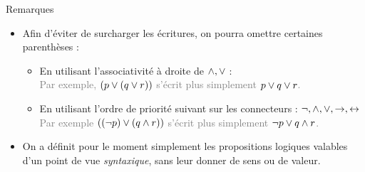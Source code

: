 \documentclass[10pt]{beamer}
\begin{document}
\begin{frame}{\Ctitle}{\stitle}
	\begin{block}{Remarques}
		\begin{itemize}
			\item Afin d'éviter de surcharger les écritures, on pourra omettre certaines parenthèses :
			      \begin{itemize}
				      \item<2-> En utilisant l'associativité à droite de $\wedge, \vee$ : \\
					      \onslide<3-> \textcolor{gray}{Par exemple, $(p \vee (q \vee r))$ s'écrit plus simplement $p \vee q \vee r$.}
				      \item<4-> En utilisant l'ordre de priorité suivant sur les connecteurs : $\neg, \wedge, \vee, \to, \leftrightarrow$ \\
					      \onslide<5-> \textcolor{gray}{Par exemple $ ((\neg p) \vee (q \wedge r))$ s'écrit plus simplement $\neg p \vee q \wedge r$.}
			      \end{itemize}
			\item<7-> On a définit pour le moment simplement les propositions logiques valables d'un point de vue \textit{syntaxique}, sans leur donner de sens ou de valeur.
		\end{itemize}
	\end{block}
\end{frame}
\end{document}
